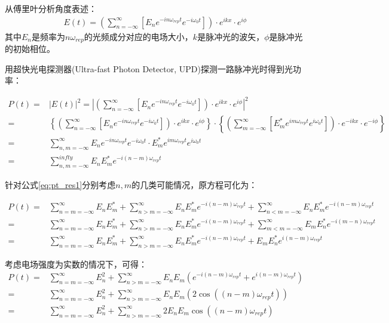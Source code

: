 从傅里叶分析角度表述：
\begin{align}
    E(t)=\left(\sum_{n=-\infty}^{\infty}\left[E_n e^{-in\omega_{rep}t} e^{-i\omega_0 t} \right]\right)\cdot e^{ikx}\cdot e^{i\phi}
\end{align}
其中$E_n$是频率为$n\omega_{rep}$的光频成分对应的电场大小，$k$是脉冲光的波矢，$\phi$是脉冲光的初始相位。

用超快光电探测器(Ultra-fast Photon Detector, UPD)探测一路脉冲光时得到光功率：
\begin{footnotesize}
\begin{align}
    P(t)=&|E(t)|^2=\left|\left(\sum_{n=-\infty}^{\infty}\left[E_n e^{-in\omega_{rep}t} e^{-i\omega_0 t} \right]\right)\cdot e^{ikx}\cdot e^{i\phi}\right|^2\\
    =&\left\{\left(\sum_{n=-\infty}^{\infty}\left[E_n e^{-in\omega_{rep}t} e^{-iω_0 t} \right]\right)\cdot e^{ikx}\cdot e^{i\phi}\right\} \cdot\left\{\left(\sum_{m=-\infty}^{\infty}\left[E^*_m e^{im\omega_{rep}t} e^{i\omega_0 t} \right]\right)\cdot e^{-ikx}\cdot e^{-i\phi}\right\}\\
    =&\sum_{n,m=-\infty}^{\infty}E_n e^{-in\omega_{rep} t} e^{-i\omega_0 t}\cdot E_m^* e^{im\omega_{rep} t} e^{i\omega_0 t}\\
    =&\sum_{n,m=-\infty}^{infty}E_n E_m^* e^{-i(n-m) \omega_{rep} t}\label{eq:pt_res1}
\end{align}    
\end{footnotesize}

针对公式\eqref{eq:pt_res1}分别考虑$n,m$的几类可能情况，原方程可化为：
\begin{footnotesize}
\begin{align}
    P(t)=&\sum_{n=m=-\infty}^{\infty}E_n E_m^*
    +\sum_{n>m=-\infty}^{\infty}E_n E_m^*e^{-i(n-m)\omega_{rep}t}+\sum_{n<m=-\infty}^{\infty}E_n E_m^*e^{-i(n-m)\omega_{rep}t}\\
    =&\sum_{n=m=-\infty}^{\infty}E_n E_m^*
    +\sum_{n>m=-\infty}^{\infty}E_n E_m^*e^{-i(n-m)\omega_{rep}t}+\sum_{m<m=-\infty}^{\infty}E_m E_n^*e^{-i(m-n)\omega_{rep}t}\\
    =&\sum_{n=m=-\infty}^{\infty}E_n E_m^*+\sum_{n>m=-\infty}^{\infty}E_n E_m^*e^{-i(n-m)\omega_{rep}t}+E_mE_n^* e^{i(n-m)\omega_{rep}t}
\end{align}
\end{footnotesize}

考虑电场强度为实数的情况下，可得：
\begin{align}
    P(t)=&\sum_{n=m=-\infty}^{\infty}E_n^2 + \sum_{n>m=-\infty}^{\infty}E_n E_m\left(e^{-i(n-m)\omega_{rep}t}+e^{i(n-m)\omega_{rep}t}\right)\\
    =&\sum_{n=m=-\infty}^{\infty}E_n^2 + \sum_{n>m=-\infty}^{\infty}E_n E_m\left(2\cos\left((n-m)\omega_{rep}t\right)\right)\\
    =&\sum_{n=m=-\infty}^{\infty}E_n^2 + \sum_{n>m=-\infty}^{\infty}2E_n E_m \cos\left((n-m)\omega_{rep}t\right)\label{eq:pt_res2}
\end{align}

